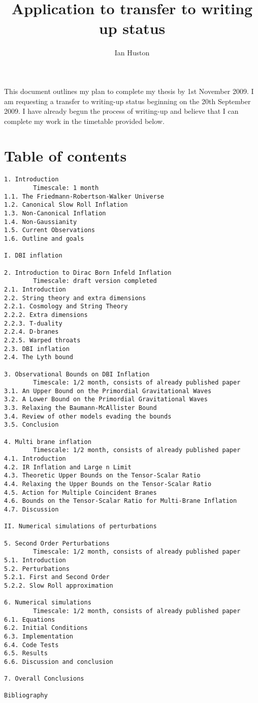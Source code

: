 \documentclass[a4paper,10pt]{article}
\title{Application to transfer to writing up status}
\author{Ian Huston}
\begin{document}
\maketitle

This document outlines my plan to complete my thesis by 1st November 2009. I am requesting a
transfer to writing-up status beginning on the 20th September 2009. I have already begun the
process of writing-up and believe that I can complete my work in the timetable provided below. 

\section*{Table of contents}
\begin{verbatim}
1. Introduction
        Timescale: 1 month
1.1. The Friedmann-Robertson-Walker Universe
1.2. Canonical Slow Roll Inflation
1.3. Non-Canonical Inflation
1.4. Non-Gaussianity
1.5. Current Observations
1.6. Outline and goals

I. DBI inflation

2. Introduction to Dirac Born Infeld Inflation
        Timescale: draft version completed
2.1. Introduction
2.2. String theory and extra dimensions
2.2.1. Cosmology and String Theory
2.2.2. Extra dimensions
2.2.3. T-duality
2.2.4. D-branes
2.2.5. Warped throats
2.3. DBI inflation
2.4. The Lyth bound

3. Observational Bounds on DBI Inflation
        Timescale: 1/2 month, consists of already published paper
3.1. An Upper Bound on the Primordial Gravitational Waves
3.2. A Lower Bound on the Primordial Gravitational Waves
3.3. Relaxing the Baumann-McAllister Bound
3.4. Review of other models evading the bounds 
3.5. Conclusion

4. Multi brane inflation
        Timescale: 1/2 month, consists of already published paper
4.1. Introduction
4.2. IR Inflation and Large n Limit
4.3. Theoretic Upper Bounds on the Tensor-Scalar Ratio
4.4. Relaxing the Upper Bounds on the Tensor-Scalar Ratio
4.5. Action for Multiple Coincident Branes
4.6. Bounds on the Tensor-Scalar Ratio for Multi-Brane Inflation
4.7. Discussion

II. Numerical simulations of perturbations

5. Second Order Perturbations
        Timescale: 1/2 month, consists of already published paper
5.1. Introduction
5.2. Perturbations
5.2.1. First and Second Order
5.2.2. Slow Roll approximation

6. Numerical simulations
        Timescale: 1/2 month, consists of already published paper
6.1. Equations
6.2. Initial Conditions
6.3. Implementation
6.4. Code Tests
6.5. Results
6.6. Discussion and conclusion

7. Overall Conclusions

Bibliography
\end{verbatim}
\end{document}

